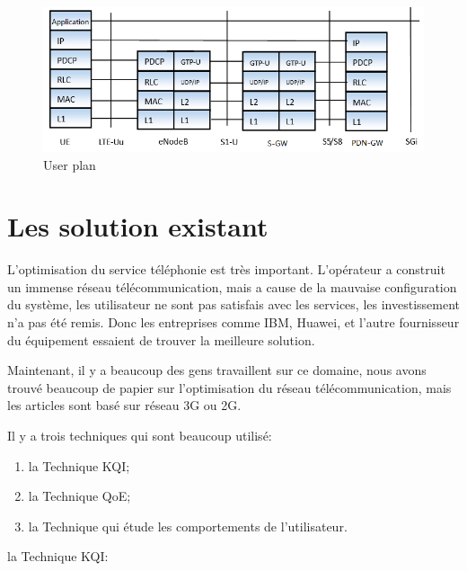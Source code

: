 \begin{figure}[H]
\centering
\includegraphics[width=0.9\linewidth]{images/S1-U}
\caption{User plan}
\label{fig:S1-U}
\end{figure}


\section{Les solution existant}

L'optimisation du service téléphonie est très important. L'opérateur a construit un immense réseau télécommunication, mais a cause de la mauvaise configuration du système, les utilisateur ne sont pas satisfais avec les services, les investissement n'a pas été remis. Donc les entreprises comme IBM, Huawei, et l'autre fournisseur du équipement essaient de trouver la meilleure solution. 

Maintenant, il y a beaucoup des gens travaillent sur ce domaine, nous avons trouvé beaucoup de papier sur l'optimisation du réseau télécommunication, mais les articles sont basé sur réseau 3G ou 2G. 

Il y a trois techniques qui sont beaucoup utilisé:
\begin{enumerate}
\item \textsf{la Technique KQI};
\item \textsf{la Technique QoE};
\item \textsf{la Technique qui étude les comportements de l'utilisateur}.
\end{enumerate}

\textsf{la Technique KQI}:

